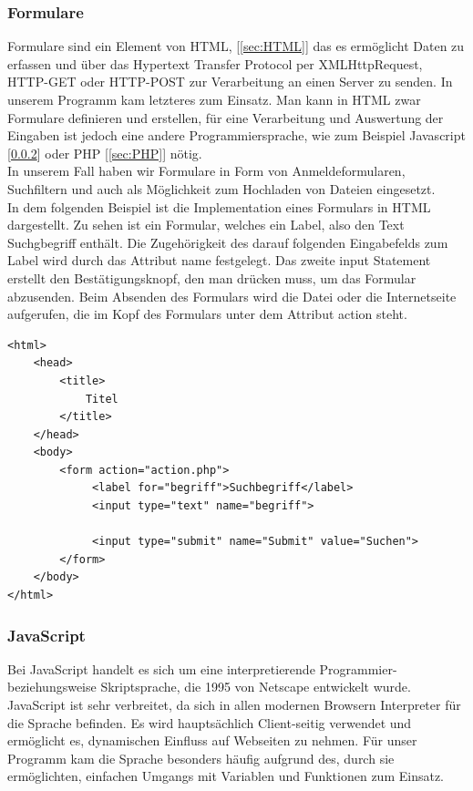 \documentclass[12pt,a4paper,bibliography=totocnumbered,listof=totocnumbered]{scrartcl}
\begin{document}
\subsubsection{Formulare}
\label{sec:Formulare}
Formulare sind ein Element von HTML, [\ref{sec:HTML}] das es ermöglicht Daten zu erfassen und über das Hypertext Transfer Protocol per XMLHttpRequest, HTTP-GET oder HTTP-POST zur Verarbeitung an einen Server zu senden.\cite{Webformular} In unserem Programm kam letzteres zum Einsatz. Man kann in HTML zwar Formulare definieren und erstellen, für eine Verarbeitung und Auswertung der Eingaben ist jedoch eine andere Programmiersprache, wie zum Beispiel Javascript [\ref{sec:JavaScript}] oder PHP [\ref{sec:PHP}] nötig.\cite{HTML/Formulare/Form} \\
In unserem Fall haben wir Formulare in Form von Anmeldeformularen, Suchfiltern und auch als Möglichkeit zum Hochladen von Dateien eingesetzt.\\
In dem folgenden Beispiel ist die Implementation eines Formulars in HTML dargestellt. Zu sehen ist ein Formular, welches ein Label, also den Text \glqq Suchgbegriff\grqq{} enthält. Die Zugehörigkeit des darauf folgenden Eingabefelds zum Label wird durch das Attribut \glqq name\grqq{} festgelegt. Das zweite \glqq input\grqq{} Statement erstellt den Bestätigungsknopf, den man drücken muss, um das Formular abzusenden. Beim Absenden des Formulars wird die Datei oder die Internetseite aufgerufen, die im Kopf des Formulars unter dem Attribut \glqq action\grqq{} steht.

\vspace{1em}
\begin{lstlisting}[caption= Beispiel für Formulare in HTML, label=lst:HTML]
<html>
	<head>
		<title>
			Titel
		</title>
	</head>
	<body>
		<form action="action.php">
 			 <label for="begriff">Suchbegriff</label>
	 		 <input type="text" name="begriff">
	 		 
	 		 <input type="submit" name="Submit" value="Suchen">
		</form>
	</body>
</html>
\end{lstlisting}

\subsubsection{JavaScript}
\label{sec:JavaScript}
Bei JavaScript handelt es sich um eine interpretierende Programmier- beziehungsweise Skriptsprache, die 1995 von Netscape entwickelt wurde.\cite{JavaScript}\cite{wiki/JavaScript} JavaScript ist sehr verbreitet, da sich in allen modernen Browsern Interpreter für die Sprache befinden. Es wird hauptsächlich Client-seitig verwendet und ermöglicht es, dynamischen Einfluss auf Webseiten zu nehmen.\cite{JavaScript-JS} Für unser Programm kam die Sprache besonders häufig aufgrund des, durch sie ermöglichten, einfachen Umgangs mit Variablen und Funktionen zum Einsatz.
\end{document}
